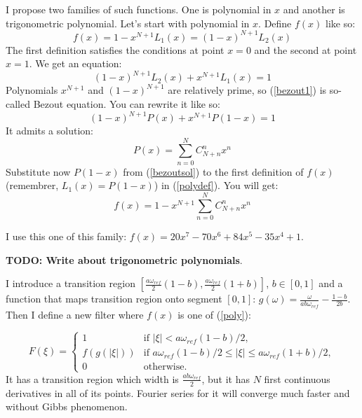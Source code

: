 \documentclass[a4paper,11pt,fleqn]{article}
\let\oldref\ref
\renewcommand{\ref}[1]{(\oldref{#1})}
\begin{document}
I propose two families of such functions. One is polynomial in $x$ and another is trigonometric polynomial. Let's start with
polynomial in $x$. Define $f(x)$ like so:
\begin{equation}
  \label{polydef}
  f(x) = 1 - x^{N+1}L_{1}(x) = (1-x)^{N+1}L_{2}(x)
\end{equation}
The first definition satisfies the conditions at point $x = 0$ and the second at point $x = 1$. We get an equation:
\begin{equation}
  \label{bezout1}
  (1-x)^{N+1}L_{2}(x) + x^{N+1}L_{1}(x) = 1
\end{equation}
Polynomials $x^{N+1}$ and $(1-x)^{N+1}$ are relatively prime, so \ref{bezout1} is so-called Bezout equation. You can rewrite it
like so:
\begin{equation}
  (1-x)^{N+1}P(x) + x^{N+1}P(1-x) = 1
\end{equation}
It admits a solution:
\begin{equation}
  \label{bezoutsol}
  P(x) = \sum_{n=0}^{N}C_{N+n}^{n}x^{n}
\end{equation}
Substitute now $P(1-x)$ from \ref{bezoutsol} to the first definition of $f(x)$ (remembrer, $L_1(x) = P(1-x)$) in \ref{polydef}. You will get:
\begin{equation}
  \label{poly}
  f(x) = 1 - x^{N+1}\sum_{n=0}^{N}C_{N+n}^{n}x^n
\end{equation}

I use this one of this family: $f(x) = 20x^7 - 70x^6 + 84x^5 - 35x^4+1$.

\textbf{TODO: Write about trigonometric polynomials}.

I introduce a transition region
$[\frac{a\omega_{ref}}{2} (1-b), \frac{a\omega_{ref}}{2} (1+b)]$, $b \in [0,1]$ and a function that maps transition region onto
segment $[0,1]$: $g(\omega) = \frac{\omega}{ab\omega_{ref}} - \frac{1-b}{2b}$. Then I define a new filter where $f(x)$ is one of
\ref{poly}:

\begin{equation}
\label{notsoideal}
F(\xi) = \left\{
\begin{array}{rl}
1 & \text{if } \left|\xi\right| < a\omega_{ref}(1-b)/2,\\
f(g(\left|\xi\right|)) & \text{if } a\omega_{ref}(1-b)/2 \leq \left|\xi\right| \leq a\omega_{ref}(1+b)/2,\\
0 & \text{otherwise}.
\end{array} \right.
\end{equation}
It has a transition region which width is $\frac{ab\omega_{ref}}{2}$, but it has $N$ first continuous derivatives in all of its
points. Fourier series for it will converge much faster and without Gibbs phenomenon.
\end{document}
